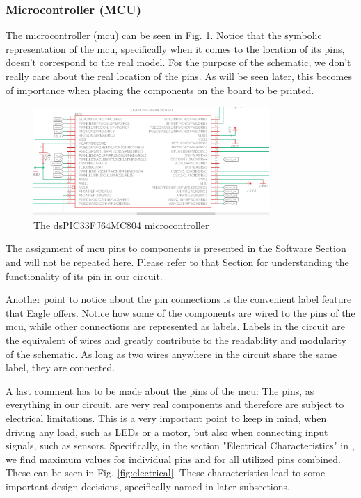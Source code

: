 \FloatBarrier

\subsubsection{Microcontroller (MCU)}

The microcontroller (mcu) can be seen in Fig. \ref{fig:mcuL}.
Notice that the symbolic representation of the mcu, specifically when it comes to the location of its pins, doesn't correspond to the real model. For the purpose of the schematic, we don't really care about the real location of the pins. As will be seen later, this becomes of importance when placing the components on the board to be printed.

\begin{figure}[htb]
    \centering
    \includegraphics[width=0.8\textwidth]{figures/hardware/MCU.PNG}
    \caption{The dsPIC33FJ64MC804 microcontroller}
    \label{fig:mcuL}
\end{figure}

\FloatBarrier

The assignment of mcu pins to components is presented in the Software Section and will not be repeated here. Please refer to that Section for understanding the functionality of its pin in our circuit.

Another point to notice about the pin connections is the convenient label feature that Eagle offers. Notice how some of the components are wired to the pins of the mcu, while other connections are represented as labels. Labels in the circuit are the equivalent of wires and greatly contribute to the readability and modularity of the schematic. As long as two wires anywhere in the circuit share the same label, they are connected.

A last comment has to be made about the pins of the mcu: The pins, as everything in our circuit, are very real components and therefore are subject to electrical limitations. This is a very important point to keep in mind, when driving any load, such as LEDs or a motor, but also when connecting input signals, such as sensors.
Specifically, in the section "Electrical Characteristics" in \cite{mcu}, we find maximum values for individual pins and for all utilized pins combined. These can be seen in Fig. \ref{fig:electrical}. These characteristics lead to some important design decisions, specifically named in later subsections.

